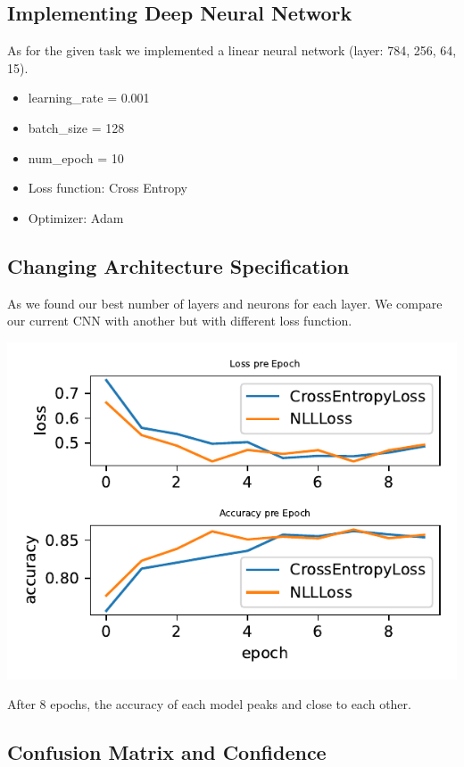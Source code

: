\documentclass[11pt]{article}
\begin{document}
\subsection{Implementing Deep Neural Network}

As for the given task we implemented a linear neural network (layer: 784, 256, 64, 15).

\begin{itemize}
    \item learning\_rate = 0.001
    \item batch\_size = 128
    \item num\_epoch = 10
    \item Loss function: Cross Entropy
    \item Optimizer: Adam
\end{itemize}

\subsection{Changing Architecture Specification}

As we found our best number of layers and neurons for each layer. We compare our current CNN with another but with different loss function.

\includegraphics{figures/2c[1]_dnn_loss_epoch.pdf}

After 8 epochs, the accuracy of each model peaks and close to each other.

\subsection{Confusion Matrix and Confidence}
\end{document}
